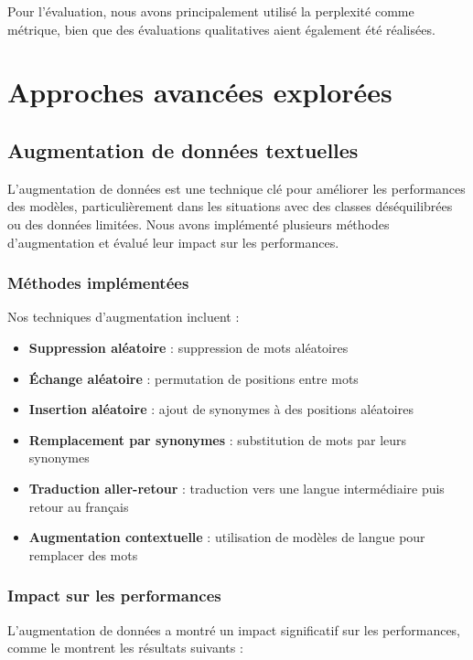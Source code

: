 \documentclass[a4paper,11pt]{article}
\begin{document}
Pour l'évaluation, nous avons principalement utilisé la perplexité comme métrique, bien que des évaluations qualitatives aient également été réalisées.

\section{Approches avancées explorées}
\label{sec:advanced}

\subsection{Augmentation de données textuelles}
\label{subsec:augmentation}

L'augmentation de données est une technique clé pour améliorer les performances des modèles, particulièrement dans les situations avec des classes déséquilibrées ou des données limitées. Nous avons implémenté plusieurs méthodes d'augmentation et évalué leur impact sur les performances.

\subsubsection{Méthodes implémentées}
Nos techniques d'augmentation incluent :

\begin{itemize}
    \item \textbf{Suppression aléatoire} : suppression de mots aléatoires
    \item \textbf{Échange aléatoire} : permutation de positions entre mots
    \item \textbf{Insertion aléatoire} : ajout de synonymes à des positions aléatoires
    \item \textbf{Remplacement par synonymes} : substitution de mots par leurs synonymes
    \item \textbf{Traduction aller-retour} : traduction vers une langue intermédiaire puis retour au français
    \item \textbf{Augmentation contextuelle} : utilisation de modèles de langue pour remplacer des mots
\end{itemize}

\subsubsection{Impact sur les performances}
L'augmentation de données a montré un impact significatif sur les performances, comme le montrent les résultats suivants :
\end{document}
